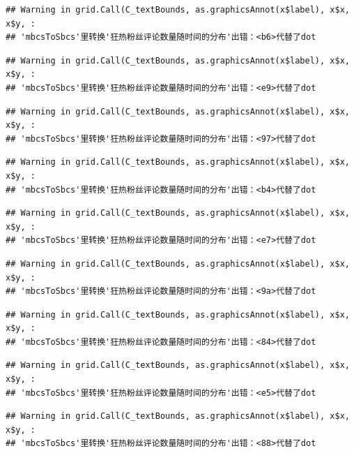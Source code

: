 \documentclass[
]{article}
\begin{document}
\begin{verbatim}
## Warning in grid.Call(C_textBounds, as.graphicsAnnot(x$label), x$x, x$y, :
## 'mbcsToSbcs'里转换'狂热粉丝评论数量随时间的分布'出错：<b6>代替了dot
\end{verbatim}

\begin{verbatim}
## Warning in grid.Call(C_textBounds, as.graphicsAnnot(x$label), x$x, x$y, :
## 'mbcsToSbcs'里转换'狂热粉丝评论数量随时间的分布'出错：<e9>代替了dot
\end{verbatim}

\begin{verbatim}
## Warning in grid.Call(C_textBounds, as.graphicsAnnot(x$label), x$x, x$y, :
## 'mbcsToSbcs'里转换'狂热粉丝评论数量随时间的分布'出错：<97>代替了dot
\end{verbatim}

\begin{verbatim}
## Warning in grid.Call(C_textBounds, as.graphicsAnnot(x$label), x$x, x$y, :
## 'mbcsToSbcs'里转换'狂热粉丝评论数量随时间的分布'出错：<b4>代替了dot
\end{verbatim}

\begin{verbatim}
## Warning in grid.Call(C_textBounds, as.graphicsAnnot(x$label), x$x, x$y, :
## 'mbcsToSbcs'里转换'狂热粉丝评论数量随时间的分布'出错：<e7>代替了dot
\end{verbatim}

\begin{verbatim}
## Warning in grid.Call(C_textBounds, as.graphicsAnnot(x$label), x$x, x$y, :
## 'mbcsToSbcs'里转换'狂热粉丝评论数量随时间的分布'出错：<9a>代替了dot
\end{verbatim}

\begin{verbatim}
## Warning in grid.Call(C_textBounds, as.graphicsAnnot(x$label), x$x, x$y, :
## 'mbcsToSbcs'里转换'狂热粉丝评论数量随时间的分布'出错：<84>代替了dot
\end{verbatim}

\begin{verbatim}
## Warning in grid.Call(C_textBounds, as.graphicsAnnot(x$label), x$x, x$y, :
## 'mbcsToSbcs'里转换'狂热粉丝评论数量随时间的分布'出错：<e5>代替了dot
\end{verbatim}

\begin{verbatim}
## Warning in grid.Call(C_textBounds, as.graphicsAnnot(x$label), x$x, x$y, :
## 'mbcsToSbcs'里转换'狂热粉丝评论数量随时间的分布'出错：<88>代替了dot
\end{verbatim}
\end{document}

